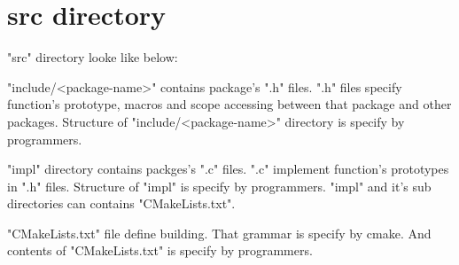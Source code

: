 \section{src directory}

\begin{crules}
\end{crules}

"src" directory looke like below:\\

"include/<package-name>" contains package's ".h" files. ".h" files
specify function's prototype, macros and scope accessing between that
package and other packages. Structure of "include/<package-name>"
directory is specify by programmers.

"impl" directory contains packges's ".c" files. ".c" implement function's
prototypes in ".h" files. Structure of "impl" is specify by programmers.
"impl" and it's sub directories can contains "CMakeLists.txt".

"CMakeLists.txt" file define building. That grammar is specify by cmake.
And contents of "CMakeLists.txt" is specify by programmers.
